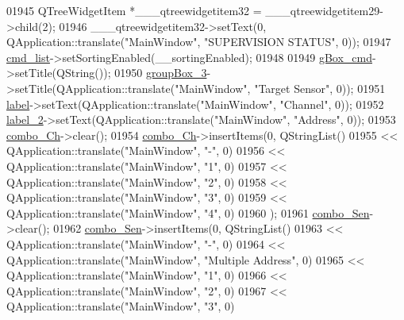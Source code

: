 \begin{DoxyCode}
01945         QTreeWidgetItem *\_\_\_qtreewidgetitem32 = \_\_\_qtreewidgetitem29->child(2);
01946         \_\_\_qtreewidgetitem32->setText(0, QApplication::translate(\textcolor{stringliteral}{"MainWindow"}, \textcolor{stringliteral}{"SUPERVISION STATUS"}, 0));
01947         \hyperlink{a00080_aa66ece71395b435e915d384fb63bac1d}{cmd\_list}->setSortingEnabled(\_\_sortingEnabled);
01948 
01949         \hyperlink{a00080_ad5c6667239e28060ba3b04ee0db97bac}{gBox\_cmd}->setTitle(QString());
01950         \hyperlink{a00080_a320d3d7ba1cb8fff7b7b95923ed10f5e}{groupBox\_3}->setTitle(QApplication::translate(\textcolor{stringliteral}{"MainWindow"}, \textcolor{stringliteral}{"Target Sensor"}, 0));
01951         \hyperlink{a00080_ad9c89133780f28e6efa2ec17ceb9cff5}{label}->setText(QApplication::translate(\textcolor{stringliteral}{"MainWindow"}, \textcolor{stringliteral}{"Channel"}, 0));
01952         \hyperlink{a00080_a2e2516d755e4dd53fc905dabddf2738a}{label\_2}->setText(QApplication::translate(\textcolor{stringliteral}{"MainWindow"}, \textcolor{stringliteral}{"Address"}, 0));
01953         \hyperlink{a00080_a263fb43f2eff37a44ff7359ba41e2eeb}{combo\_Ch}->clear();
01954         \hyperlink{a00080_a263fb43f2eff37a44ff7359ba41e2eeb}{combo\_Ch}->insertItems(0, QStringList()
01955          << QApplication::translate(\textcolor{stringliteral}{"MainWindow"}, \textcolor{stringliteral}{"-"}, 0)
01956          << QApplication::translate(\textcolor{stringliteral}{"MainWindow"}, \textcolor{stringliteral}{"1"}, 0)
01957          << QApplication::translate(\textcolor{stringliteral}{"MainWindow"}, \textcolor{stringliteral}{"2"}, 0)
01958          << QApplication::translate(\textcolor{stringliteral}{"MainWindow"}, \textcolor{stringliteral}{"3"}, 0)
01959          << QApplication::translate(\textcolor{stringliteral}{"MainWindow"}, \textcolor{stringliteral}{"4"}, 0)
01960         );
01961         \hyperlink{a00080_ad95005b5fcac8126171019298147b285}{combo\_Sen}->clear();
01962         \hyperlink{a00080_ad95005b5fcac8126171019298147b285}{combo\_Sen}->insertItems(0, QStringList()
01963          << QApplication::translate(\textcolor{stringliteral}{"MainWindow"}, \textcolor{stringliteral}{"-"}, 0)
01964          << QApplication::translate(\textcolor{stringliteral}{"MainWindow"}, \textcolor{stringliteral}{"Multiple Address"}, 0)
01965          << QApplication::translate(\textcolor{stringliteral}{"MainWindow"}, \textcolor{stringliteral}{"1"}, 0)
01966          << QApplication::translate(\textcolor{stringliteral}{"MainWindow"}, \textcolor{stringliteral}{"2"}, 0)
01967          << QApplication::translate(\textcolor{stringliteral}{"MainWindow"}, \textcolor{stringliteral}{"3"}, 0)

\end{DoxyCode}
